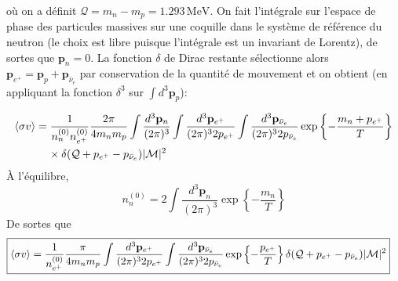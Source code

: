 \documentclass{article}
\numberwithin{equation}{section}
\newcommand{\s}{\hspace{0.1cm}}
\begin{document}
où on a définit $\mathcal{Q} = m_n - m_p = 1.293\, \text{MeV}$. On fait l'intégrale 
sur l'espace de phase des particules massives sur une coquille dans 
le système de référence du neutron (le choix est libre puisque 
l'intégrale est un invariant de Lorentz), de sortes que $\mathbf{p}_n = 0$. 
La fonction $\delta $ de Dirac restante sélectionne alors 
$\mathbf{p}_{e^{+}} = \mathbf{p}_p + \mathbf{p}_{\bar{\nu}_e}$ par 
conservation de la quantité de mouvement et on obtient (en appliquant 
la fonction $\delta^{3}$ sur $\int d^{3}\mathbf{p}_p$):

\begin{align*}
        \expval{\sigma v} &= \frac{1}{n_n^{(0)} n_{e^{+}}^{(0)}}
        \frac{2\pi}{ 4m_n m_p}
        \int \frac{d^{3}\mathbf{p}_n}{(2\pi)^{3}}
        \int \frac{d^{3}\mathbf{p}_{e^{+}}}{(2\pi)^{3}2p_{e^{+}}}
        \int \frac{d^{3}\mathbf{p}_{\bar{\nu}_e}}{(2\pi)^{3}2p_{\bar{\nu}_e}}
        \exp \left\{ - \frac{m_n + p_{e^{+}}}{T} \right\}\\
                          &\s\s\s\s\times 
        \delta(\mathcal{Q} + p_{e^{+}} - p_{\bar{\nu}_e})
        |\mathcal{M}|^{2}
\end{align*}
À l'équilibre, 
\[
        n_n^{(0)} = 2\int \frac{d^{3}\mathbf{p}_n}{(2\pi)^{3}}\exp \left\{ -\frac{m_n}{T} \right\}
\]
De sortes que 
\begin{align*}
        \Aboxed{\expval{\sigma v} &= \frac{1}{n_{e^{+}}^{(0)}}
        \frac{\pi}{ 4m_n m_p}
        \int \frac{d^{3}\mathbf{p}_{e^{+}}}{(2\pi)^{3}2p_{e^{+}}}
        \int \frac{d^{3}\mathbf{p}_{\bar{\nu}_e}}{(2\pi)^{3}2p_{\bar{\nu}_e}}
        \exp \left\{ - \frac{p_{e^{+}}}{T} \right\}
        \delta(\mathcal{Q} + p_{e^{+}} - p_{\bar{\nu}_e})
|\mathcal{M}|^{2}}
\end{align*}
\end{document}
